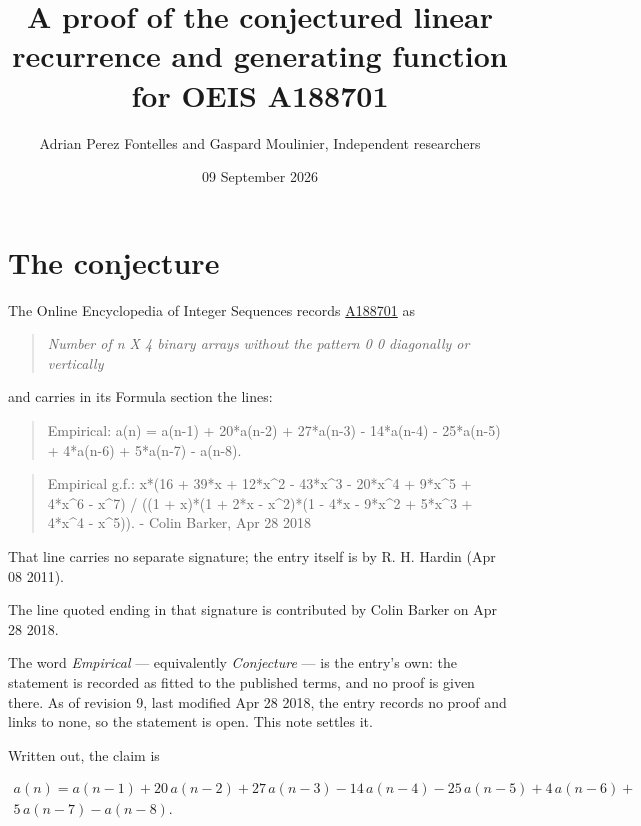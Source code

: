 \documentclass[11pt]{article}
\title{A proof of the conjectured linear recurrence and generating function for OEIS A188701}
\author{Adrian Perez Fontelles and Gaspard Moulinier, Independent researchers}
\date{09 September 2026}
\theoremstyle{definition}
\begin{document}
\maketitle
\section{The conjecture}

The Online Encyclopedia of Integer Sequences records \href{https://oeis.org/A188701}{A188701} as

\begin{quote}\itshape Number of n X 4 binary arrays without the pattern 0 0 diagonally or vertically\end{quote}

and carries in its Formula section the lines:

\begin{quote}\ttfamily Empirical: a(n) = a(n-1) + 20*a(n-2) + 27*a(n-3) - 14*a(n-4) - 25*a(n-5) + 4*a(n-6) + 5*a(n-7) - a(n-8).\end{quote}

\begin{quote}\ttfamily Empirical g.f.: x*(16 + 39*x + 12*x\textasciicircum{}2 - 43*x\textasciicircum{}3 - 20*x\textasciicircum{}4 + 9*x\textasciicircum{}5 + 4*x\textasciicircum{}6 - x\textasciicircum{}7) / ((1 + x)*(1 + 2*x - x\textasciicircum{}2)*(1 - 4*x - 9*x\textasciicircum{}2 + 5*x\textasciicircum{}3 + 4*x\textasciicircum{}4 - x\textasciicircum{}5)). - Colin Barker, Apr 28 2018\end{quote}

That line carries no separate signature; the entry itself is by R. H. Hardin (Apr 08 2011).

The line quoted ending in that signature is contributed by Colin Barker on Apr 28 2018.

The word {\itshape Empirical} --- equivalently {\itshape Conjecture} --- is the entry's own: the statement is recorded as fitted to the published terms, and no proof is given there. As of revision 9, last modified Apr 28 2018, the entry records no proof and links to none, so the statement is open. This note settles it.

Written out, the claim is

\begin{multline*} a(n) = a(n-1) + 20\,a(n-2) + 27\,a(n-3) - 14\,a(n-4) - 25\,a(n-5) + 4\,a(n-6) + \\ 5\,a(n-7) - a(n-8). \end{multline*}
\end{document}
